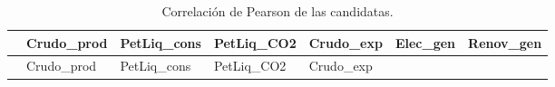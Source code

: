\documentclass[oneside, openany, fontset=libertinus]{mitthesis}
\begin{document}
\Needspace{2.31in}

\begin{longtable}[]{@{}
  >{\raggedright\arraybackslash}p{}
  >{\raggedleft\arraybackslash}p{}
  >{\raggedleft\arraybackslash}p{}
  >{\raggedleft\arraybackslash}p{}
  >{\raggedleft\arraybackslash}p{}
  >{\raggedleft\arraybackslash}p{}
  >{\raggedleft\arraybackslash}p{}@{}}
\caption{Correlación de Pearson de las candidatas.}\tabularnewline
\toprule\noalign{}
\begin{minipage}[b]{\linewidth}\raggedright
\end{minipage} & \begin{minipage}[b]{\linewidth}\raggedleft
Crudo\_prod
\end{minipage} & \begin{minipage}[b]{\linewidth}\raggedleft
PetLiq\_cons
\end{minipage} & \begin{minipage}[b]{\linewidth}\raggedleft
PetLiq\_CO2
\end{minipage} & \begin{minipage}[b]{\linewidth}\raggedleft
Crudo\_exp
\end{minipage} & \begin{minipage}[b]{\linewidth}\raggedleft
Elec\_gen
\end{minipage} & \begin{minipage}[b]{\linewidth}\raggedleft
Renov\_gen
\end{minipage} \\
\midrule\noalign{}
\endfirsthead
\toprule\noalign{}
\begin{minipage}[b]{\linewidth}\raggedright
\end{minipage} & \begin{minipage}[b]{\linewidth}\raggedleft
Crudo\_prod
\end{minipage} & \begin{minipage}[b]{\linewidth}\raggedleft
PetLiq\_cons
\end{minipage} & \begin{minipage}[b]{\linewidth}\raggedleft
PetLiq\_CO2
\end{minipage} & \begin{minipage}[b]{\linewidth}\raggedleft
Crudo\_exp
\end{minipage} & \begin{minipage}[b]{\linewidth}\raggedleft

\end{minipage}
\end{longtable}
\end{document}
